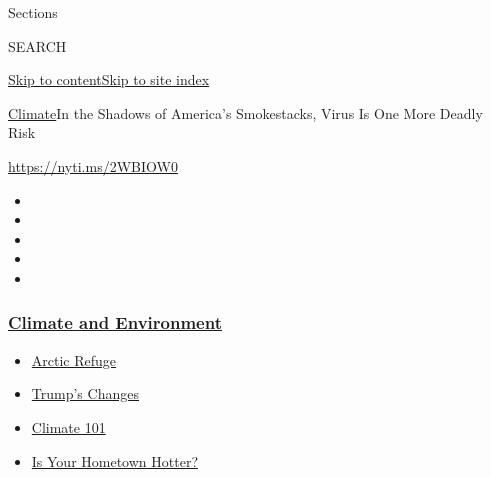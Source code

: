 Sections

SEARCH

\protect\hyperlink{site-content}{Skip to
content}\protect\hyperlink{site-index}{Skip to site index}

\href{/section/climate}{Climate}\textbar{}In the Shadows of America's
Smokestacks, Virus Is One More Deadly Risk

\url{https://nyti.ms/2WBIOW0}

\begin{itemize}
\item
\item
\item
\item
\item
\end{itemize}

\hypertarget{climate-and-environment}{%
\subsubsection{\texorpdfstring{\href{https://www.nytimes3xbfgragh.onion/section/climate?name=styln-climate\&region=TOP_BANNER\&variant=undefined\&block=storyline_menu_recirc\&action=click\&pgtype=Article\&impression_id=01570e60-e39b-11ea-9f3a-f5bd08dc668f}{Climate
and
Environment}}{Climate and Environment}}\label{climate-and-environment}}

\begin{itemize}
\tightlist
\item
  \href{https://www.nytimes3xbfgragh.onion/2020/08/17/climate/alaska-oil-drilling-anwr.html?name=styln-climate\&region=TOP_BANNER\&variant=undefined\&block=storyline_menu_recirc\&action=click\&pgtype=Article\&impression_id=01570e61-e39b-11ea-9f3a-f5bd08dc668f}{Arctic
  Refuge}
\item
  \href{https://www.nytimes3xbfgragh.onion/interactive/2020/climate/trump-environment-rollbacks.html?name=styln-climate\&region=TOP_BANNER\&variant=undefined\&block=storyline_menu_recirc\&action=click\&pgtype=Article\&impression_id=01570e62-e39b-11ea-9f3a-f5bd08dc668f}{Trump's
  Changes}
\item
  \href{https://www.nytimes3xbfgragh.onion/interactive/2020/04/19/climate/climate-crash-course-1.html?name=styln-climate\&region=TOP_BANNER\&variant=undefined\&block=storyline_menu_recirc\&action=click\&pgtype=Article\&impression_id=01573570-e39b-11ea-9f3a-f5bd08dc668f}{Climate
  101}
\item
  \href{https://www.nytimes3xbfgragh.onion/interactive/2018/08/30/climate/how-much-hotter-is-your-hometown.html?name=styln-climate\&region=TOP_BANNER\&variant=undefined\&block=storyline_menu_recirc\&action=click\&pgtype=Article\&impression_id=01573571-e39b-11ea-9f3a-f5bd08dc668f}{Is
  Your Hometown Hotter?}
\end{itemize}

